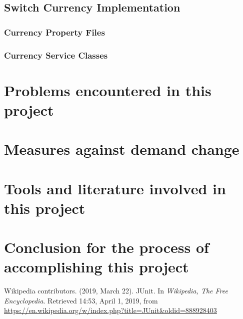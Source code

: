 \documentclass[a4paper]{report}
\begin{document}
\section{Switch Currency Implementation}
\subsection{Currency Property Files}
\subsection{Currency Service Classes}


\chapter{Problems encountered in this project}


\chapter{Measures against demand change}



\chapter{Tools and literature involved in this project}



\chapter{Conclusion for the process of accomplishing this project}


\begin{thebibliography}{A}


Wikipedia contributors. (2019, March 22). JUnit. In \emph{Wikipedia, The Free Encyclopedia}. Retrieved 14:53, April 1, 2019, from \url{https://en.wikipedia.org/w/index.php?title=JUnit&oldid=888928403}

\end{thebibliography}
\end{document}
